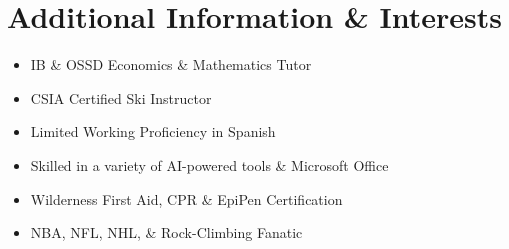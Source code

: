 \documentclass[letterpaper,10pt]{article}
\newcommand{\resumeItem}[1]{
  \item\small{
    {#1 \vspace{-2pt}}
  }
}
\begin{document}
\section{Additional Information \& Interests}
    \begin{multicols}{2}
        \begin{itemize}[label=--, topsep=0pt, itemsep=0pt, parsep=0pt, partopsep=0pt, leftmargin=*]
            \resumeItem{IB \& OSSD Economics \& Mathematics Tutor}
            \resumeItem{CSIA Certified Ski Instructor}
            \resumeItem{Limited Working Proficiency in Spanish}
            \resumeItem{Skilled in a variety of AI-powered tools \& Microsoft Office}
            \resumeItem{Wilderness First Aid, CPR \& EpiPen Certification}
            \resumeItem{NBA, NFL, NHL, \& Rock-Climbing Fanatic}
        \end{itemize}
    \end{multicols}
\end{document}
